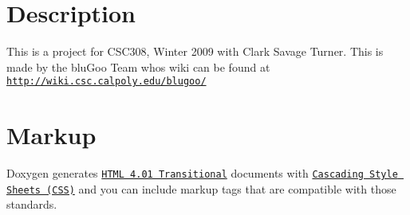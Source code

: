 \hypertarget{index_Description}{}\section{Description}\label{index_Description}
This is a project for CSC308, Winter 2009 with Clark Savage Turner. This is made by the bluGoo Team whos wiki can be found at \href{http://wiki.csc.calpoly.edu/blugoo/}{\tt http://wiki.csc.calpoly.edu/blugoo/}\hypertarget{index_Markup}{}\section{Markup}\label{index_Markup}
Doxygen generates \href{http://validator-test.w3.org/check?uri=referer}{\tt HTML 4.01 Transitional} documents with \href{http://jigsaw.w3.org/css-validator/validator}{\tt Cascading Style Sheets (CSS)} and you can include markup tags that are compatible with those standards. 